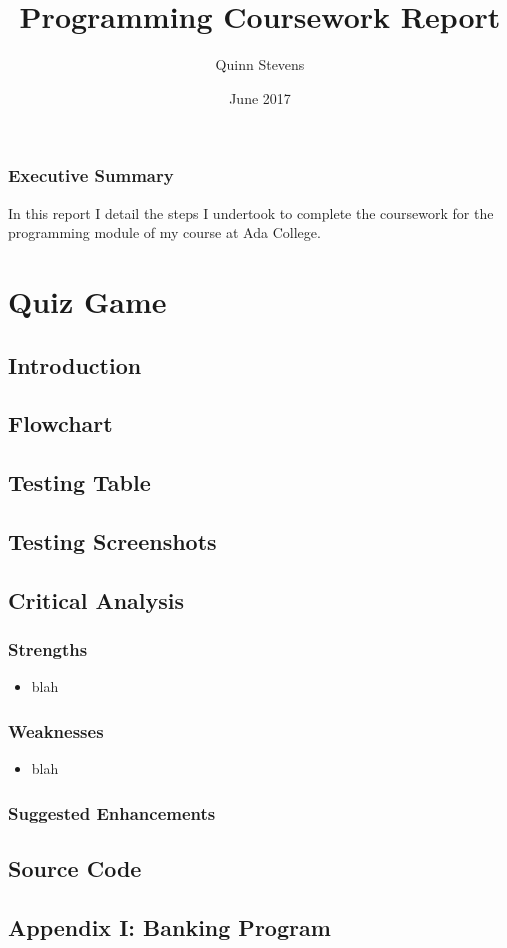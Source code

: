 \documentclass{report}
\title{Programming Coursework Report}
\author{Quinn Stevens}
\date{June 2017}
\begin{document}
\maketitle

\section*{Executive Summary}
In this report I detail the steps I undertook to complete the coursework for the programming module of my course at Ada College.

\tableofcontents

\part{Quiz Game}
    \chapter{Introduction}

    \chapter{Flowchart}

    \chapter{Testing Table}
    
    \chapter{Testing Screenshots}

    \chapter{Critical Analysis}
        \section{Strengths}
        \begin{itemize}
            \item blah
        \end{itemize}
        
        \section{Weaknesses}
        \begin{itemize}
            \item blah
        \end{itemize}
        
        \section{Suggested Enhancements}
    
    \chapter{Source Code}

\chapter*{Appendix I: Banking Program}
\end{document}
